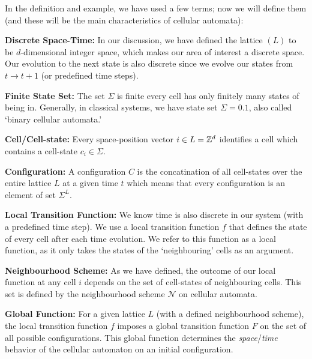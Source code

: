 \documentclass[11pt, oneside, listof=totoc]{scrbook}
\begin{document}
In the definition and example, we have used a few terms; now we will define them (and these will be the main characteristics of cellular automata):
\begin{list}{}{}
    \item[\bfseries Discrete Space-Time:] In our discussion, we have defined the lattice \((L)\) to be \(d\)-dimensional integer space, which makes our area of interest a discrete space. Our evolution to the next state is also discrete since we evolve our states from \(t \to t+1\) (or predefined time steps).

    \item[\bfseries Finite State Set:] The set \(\Sigma\) is finite \ie every cell has only finitely many states of being in. Generally, in classical systems, we have state set \(\Sigma = \qty{0, 1}\), also called `binary cellular automata.'

    \item[\bfseries Cell/Cell-state:] Every space-position vector \(i \in L = \mathbb Z^d\) identifies a cell which contains a cell-state \(c_i \in \Sigma\).

    \item[\bfseries Configuration:] A configuration \(C\) is the concatination of all cell-states over the entire lattice \(L\) at a given time \(t\) which means that every configuration is an element of set \(\Sigma^L\).

    \item[\bfseries Local Transition Function:] We know time is also discrete in our system (with a predefined time step). We use a local transition function \(f\) that defines the state of every cell after each time evolution. We refer to this function as a local function, as it only takes the states of the `neighbouring' cells as an argument.

    \item[\bfseries Neighbourhood Scheme:] As we have defined, the outcome of our local function at any cell \(i\) depends on the set of cell-states of neighbouring cells. This set is defined by the neighbourhood scheme \(\mathcal{N}\) on cellular automata.

    \item[\bfseries Global Function:] For a given lattice \(L\) (with a defined neighbourhood scheme), the local transition function \(f\) imposes a global transition function \(F\) on the set of all possible configurations. This global function determines the \emph{space}/\emph{time} behavior of the cellular automaton on an initial configuration.
\end{list}
\end{document}
